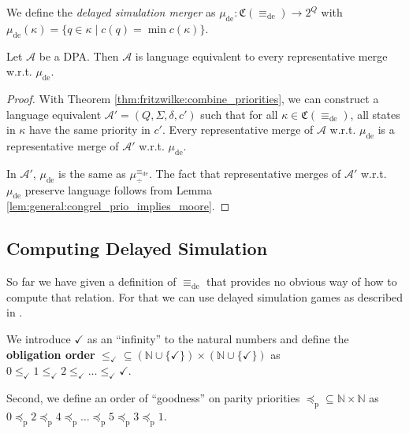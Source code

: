 \begin{defn}
	We define the \emph{delayed simulation merger} as $\mu_\text{de} : \mathfrak{C}(\equiv_\text{de}) \rightarrow 2^Q$ with $\mu_\text{de}(\kappa) = \{ q \in \kappa \mid c(q) = \min c(\kappa) \}$.
\end{defn}

\begin{cor}
	Let $\mathcal{A}$ be a DPA. Then $\mathcal{A}$ is language equivalent to every representative merge w.r.t. $\mu_\text{de}$.
\end{cor}

\begin{proof}
	With Theorem \ref{thm:fritzwilke:combine_priorities}, we can construct a language equivalent $\mathcal{A}' = (Q, \Sigma, \delta, c')$ such that for all $\kappa \in \mathfrak{C}(\equiv_\text{de})$, all states in $\kappa$ have the same priority in $c'$. Every representative merge of $\mathcal{A}$ w.r.t. $\mu_\text{de}$ is a representative merge of $\mathcal{A}'$ w.r.t. $\mu_\text{de}$.
	
	In $\mathcal{A}'$, $\mu_\text{de}$ is the same as $\mu^{\equiv_\text{de}}_\div$. The fact that representative merges of $\mathcal{A}'$ w.r.t. $\mu_\text{de}$ preserve language follows from Lemma \ref{lem:general:congrel_prio_implies_moore}.
\end{proof}


\vspace{10pt}

\subsection{Computing Delayed Simulation}
So far we have given a definition of $\equiv_\text{de}$ that provides no obvious way of how to compute that relation. For that we can use delayed simulation games as described in \cite{FritzWilke06}.

\begin{defn}
	We introduce $\checkmark$ as an \enquote{infinity} to the natural numbers and define the \textbf{obligation order} $\leq_\checkmark \subseteq (\mathbb{N} \cup \{\checkmark\}) \times (\mathbb{N} \cup \{\checkmark\})$ as $0 \leq_\checkmark 1 \leq_\checkmark 2 \leq_\checkmark \dots \leq_\checkmark \checkmark$.
	
	Second, we define an order of \enquote{goodness} on parity priorities $\preceq_\text{p} \subseteq \mathbb{N} \times \mathbb{N}$ as $0 \preceq_\text{p} 2 \preceq_\text{p} 4 \preceq_\text{p} \dots \preceq_\text{p} 5 \preceq_\text{p} 3 \preceq_\text{p} 1$.
\end{defn}

